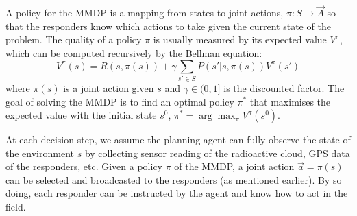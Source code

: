 A policy for the MMDP is a mapping from states to joint actions,
$\pi: S \rightarrow \vec{A}$ so that the responders know which
actions to take given the current state of the problem. The quality
of a policy $\pi$ is usually measured by its expected value
$V^\pi$, which can be computed recursively by the Bellman equation:
\begin{equation}
  V^\pi(s) = R(s, \pi(s)) + \gamma\sum_{s'\in S} P(s'|s, \pi(s)) V^\pi(s')
\end{equation}
where $\pi(s)$ is a joint action given $s$ and $\gamma\in(0, 1]$ is
the discounted factor. The goal of solving the MMDP is to find an
optimal policy $\pi^*$ that maximises the expected value with the
initial state $s^0$, $\pi^* = \arg\max_{\pi} V^\pi(s^0)$.

At each decision step, we assume the planning agent can fully
observe the state of the environment $s$ by collecting sensor
reading of the radioactive cloud, GPS data of the responders, etc.
Given a policy $\pi$ of the MMDP, a joint action $\vec{a}=\pi(s)$
can be selected and broadcasted to the responders (as mentioned
earlier). By so doing, each responder can be instructed by the
agent and know how to act in the field.
